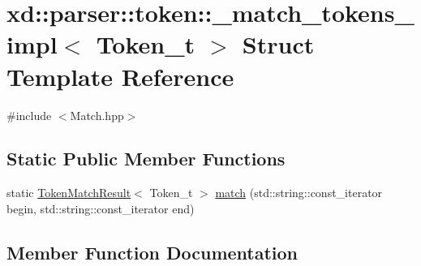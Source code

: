 \hypertarget{structxd_1_1parser_1_1token_1_1__match__tokens__impl_3_01_token__t_01_4}{}\section{xd\+:\+:parser\+:\+:token\+:\+:\+\_\+match\+\_\+tokens\+\_\+impl$<$ Token\+\_\+t $>$ Struct Template Reference}
\label{structxd_1_1parser_1_1token_1_1__match__tokens__impl_3_01_token__t_01_4}


{\ttfamily \#include $<$Match.\+hpp$>$}

\subsection*{Static Public Member Functions}
\begin{DoxyCompactItemize}
\item 
static \mbox{\hyperlink{namespacexd_1_1parser_1_1token_a766c52bbfb7cb1f08498ef0bb9ec756e}{Token\+Match\+Result}}$<$ Token\+\_\+t $>$ \mbox{\hyperlink{structxd_1_1parser_1_1token_1_1__match__tokens__impl_3_01_token__t_01_4_a4f5b4f7e4c4695095f731623d0bbc1f3}{match}} (std\+::string\+::const\+\_\+iterator begin, std\+::string\+::const\+\_\+iterator end)
\end{DoxyCompactItemize}


\subsection{Member Function Documentation}
\mbox{\label{structxd_1_1parser_1_1token_1_1__match__tokens__impl_3_01_token__t_01_4_a4f5b4f7e4c4695095f731623d0bbc1f3}} 
